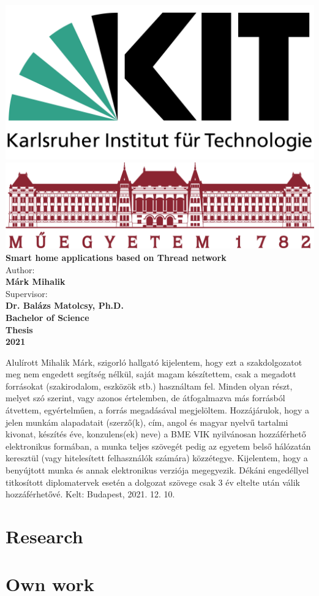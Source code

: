 \documentclass[12pt,a4paper,fleqn,oneside]{report}
\renewcommand{\maketitle}{
    \begin{titlepage}
        \begin{center}
            \includegraphics[scale=0.1]{img/kitlogo.png}\\
            \includegraphics[scale=0.5]{img/egyetem.png}\\
            \vspace{1cm}
            \huge\textbf{Smart home applications based on Thread network}\\
            \vspace{1cm}
            \Large{Author:}\\
            \LARGE\textbf{Márk Mihalik}\\
            \vspace{1cm}
            \Large{Supervisor:}\\
            \textbf{Dr. Balázs Matolcsy, Ph.D.}\\
            \vspace{1cm}
            \Large\textbf{Bachelor of Science}\\
            \Large\textbf{Thesis}\\
            \vspace{1cm}
            \Large\textbf{2021}
        \end{center}
    \end{titlepage}
}
\begin{document}
\maketitle

\noindent
\thispagestyle{empty}
Alulírott Mihalik Márk, szigorló hallgató kijelentem, hogy ezt a szakdolgozatot meg nem engedett segítség nélkül, saját magam készítettem, csak a megadott forrásokat (szakirodalom, eszközök stb.) használtam fel. Minden olyan részt, melyet szó szerint, vagy azonos értelemben, de átfogalmazva más forrásból átvettem, egyértelműen, a forrás megadásával megjelöltem.
Hozzájárulok, hogy a jelen munkám alapadatait (szerző(k), cím, angol és magyar nyelvű tartalmi kivonat, készítés éve, konzulens(ek) neve) a BME VIK nyilvánosan hozzáférhető elektronikus formában, a munka teljes szövegét pedig az egyetem belső hálózatán keresztül (vagy hitelesített felhasználók számára) közzétegye. Kijelentem, hogy a benyújtott munka és annak elektronikus verziója megegyezik. Dékáni engedéllyel titkosított diplomatervek esetén a dolgozat szövege csak 3 év eltelte után válik hozzáférhetővé.
\newline
\newline
Kelt: Budapest, 2021. 12. 10.    


\clearpage

\renewcommand{\abstractname}{Kivonat}
\begin{abstract}
    \noindent
    
\end{abstract}
\clearpage

\renewcommand{\abstractname}{Abstract}
\begin{abstract}
    \noindent
    
\end{abstract}
\clearpage


\chapter{Research}



\chapter{Own work}






\clearpage

\clearpage
\tableofcontents
\clearpage
\listoffigures
\clearpage

\printbibliography

\clearpage
\end{document}
